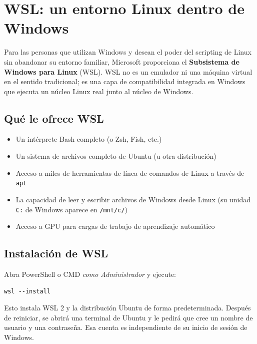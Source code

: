 \section{WSL: un entorno Linux dentro de Windows}
\label{sec:wsl}

Para las personas que utilizan Windows y desean el poder del scripting de
Linux sin abandonar su entorno familiar, Microsoft proporciona el
\textbf{Subsistema de Windows para Linux} (WSL). WSL no es un emulador ni
una máquina virtual en el sentido tradicional; es una capa de compatibilidad
integrada en Windows que ejecuta un núcleo Linux real junto al núcleo de
Windows.

\subsection{Qué le ofrece WSL}

\begin{itemize}
  \item Un intérprete Bash completo (o Zsh, Fish, etc.)
  \item Un sistema de archivos completo de Ubuntu (u otra distribución)
  \item Acceso a miles de herramientas de línea de comandos de Linux a
        través de \texttt{apt}
  \item La capacidad de leer y escribir archivos de Windows desde Linux
        (su unidad \texttt{C:} de Windows aparece en \texttt{/mnt/c/})
  \item Acceso a GPU para cargas de trabajo de aprendizaje automático
\end{itemize}

\subsection{Instalación de WSL}

Abra PowerShell o CMD \emph{como Administrador} y ejecute:

\begin{lstlisting}[style=windowsStyle, caption={Instalación de WSL desde PowerShell}]
wsl --install
\end{lstlisting}

Esto instala WSL 2 y la distribución Ubuntu de forma predeterminada.
Después de reiniciar, se abrirá una terminal de Ubuntu y le pedirá que cree
un nombre de usuario y una contraseña. Esa cuenta es independiente de su
inicio de sesión de Windows.

